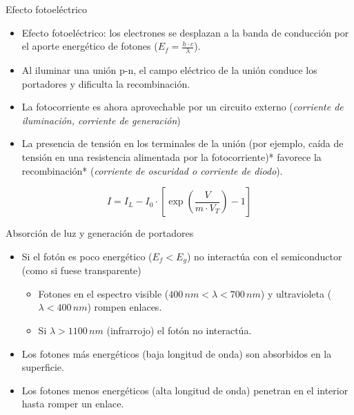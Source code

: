 \documentclass[xcolor={usenames,svgnames,dvipsnames}]{beamer}
\begin{document}
\begin{frame}[label=sec-2-0-2]{Efecto fotoeléctrico}
\begin{itemize}
\item Efecto fotoeléctrico: \alert{los electrones se desplazan a la banda de
conducción por el aporte energético de fotones}
($E_{f}=\frac{h\cdot c}{\lambda}$).

\item Al \alert{iluminar una unión p-n}, el \alert{campo eléctrico} de la unión conduce
los portadores y \alert{dificulta la recombinación}.

\item La \alert{fotocorriente} es ahora \alert{aprovechable} por un circuito externo
(\emph{corriente de iluminación, corriente de generación})

\item La presencia de \alert{tensión en los terminales} de la unión (por ejemplo,
caída de tensión en una resistencia alimentada por la fotocorriente)*
favorece la recombinación* (\emph{corriente de oscuridad o corriente de
diodo}).
\end{itemize}

$$I=I_{L}-I_{0}\cdot[\exp(\frac{V}{m\cdot V_{T}})-1]$$
\end{frame}

\begin{frame}[label=sec-2-0-3]{Absorción de luz y generación de portadores}
\begin{itemize}
\item Si el \alert{fotón es poco energético} ($E_{f}<E_{g}$) \alert{no interactúa con
el semiconductor} (como si fuese transparente)

\begin{itemize}
\item Fotones en el espectro visible ($400\, nm<\lambda<700\, nm$) y
ultravioleta ($\lambda<400\, nm$) rompen enlaces.

\item Si $\lambda>1100\, nm$ (infrarrojo) el fotón no interactúa.
\end{itemize}

\item Los \alert{fotones más energéticos} (baja longitud de onda) son \alert{absorbidos en la superficie}.

\item Los \alert{fotones menos energéticos} (alta longitud de onda) penetran en el interior hasta \alert{romper un enlace}.
\end{itemize}
\end{frame}
\end{document}

